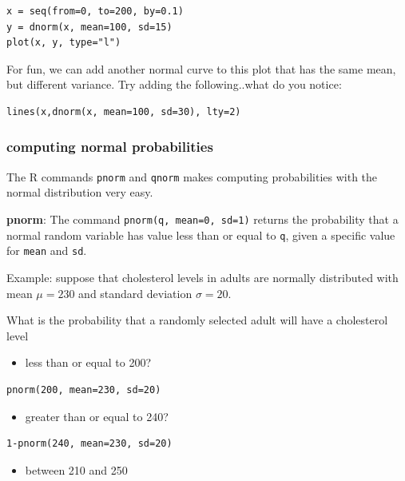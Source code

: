 \documentclass[11pt]{article}
\begin{document}
\begin{verbatim}
x = seq(from=0, to=200, by=0.1)
y = dnorm(x, mean=100, sd=15)
plot(x, y, type="l")
\end{verbatim}

For fun, we can add another normal curve to this plot that has the same mean, but different variance.  Try adding the following..what do you notice:

\begin{verbatim}
lines(x,dnorm(x, mean=100, sd=30), lty=2)
\end{verbatim}

\subsubsection*{computing normal probabilities}
\label{sec-2-2-1}

The R commands \texttt{pnorm} and \texttt{qnorm} makes computing probabilities with the normal distribution very easy.

\textbf{pnorm}: The command \texttt{pnorm(q, mean=0, sd=1)} returns the probability that a normal random variable has value less than or equal to \texttt{q}, given a specific value for \texttt{mean} and \texttt{sd}.  

Example: suppose that cholesterol levels in adults are normally distributed with mean $\mu=230$ and standard deviation $\sigma=20$.  

What is the probability that a randomly selected adult will have a cholesterol level 

\begin{itemize}
\item less than or equal to 200?
\end{itemize}

\begin{verbatim}
pnorm(200, mean=230, sd=20)
\end{verbatim}

\begin{itemize}
\item greater than or equal to 240?
\end{itemize}

\begin{verbatim}
1-pnorm(240, mean=230, sd=20)
\end{verbatim}

\begin{itemize}
\item between 210 and 250
\end{itemize}
\end{document}
